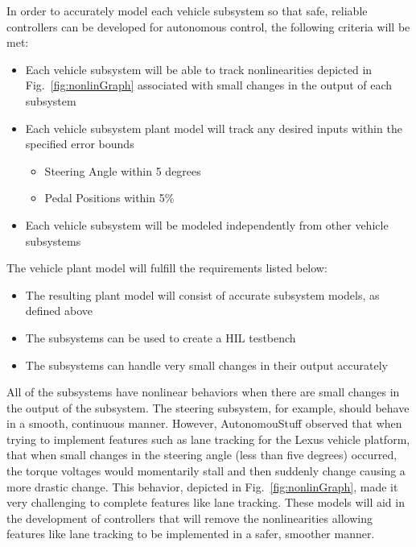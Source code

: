 \documentclass[journal,twoside,web]{ieeecolor}
\begin{document}
In order to accurately model each vehicle subsystem so that safe, reliable controllers can be developed for autonomous control, the following criteria will be met:
\begin{itemize}
\item Each vehicle subsystem will be able to track nonlinearities depicted in Fig.~\ref{fig:nonlinGraph} associated with small changes in the output of each subsystem
\item Each vehicle subsystem plant model will track any desired inputs within the specified error bounds
	\begin{itemize}
		\item Steering Angle within 5 degrees
		\item Pedal Positions within 5\%
	\end{itemize}
\item Each vehicle subsystem will be modeled independently from other vehicle subsystems
\end{itemize}

The vehicle plant model will fulfill the requirements listed below:
\begin{itemize}
    \item The resulting plant model will consist of accurate subsystem models, as defined above
    \item The subsystems can be used to create a HIL testbench
    \item The subsystems can handle very small changes in their output accurately
\end{itemize}

All of the subsystems have nonlinear behaviors when there are small changes in the output of the subsystem. The steering subsystem, for example, should behave in a smooth, continuous manner. However, AutonomouStuff observed that when trying to implement features such as lane tracking for the Lexus vehicle platform, that when small changes in the steering angle (less than five degrees) occurred, the torque voltages would momentarily stall and then suddenly change causing a more drastic change. This behavior, depicted in Fig.~\ref{fig:nonlinGraph}, made it very challenging to complete features like lane tracking. These models will aid in the development of controllers that will remove the nonlinearities allowing features like lane tracking to be implemented in a safer, smoother manner. 
\end{document}
